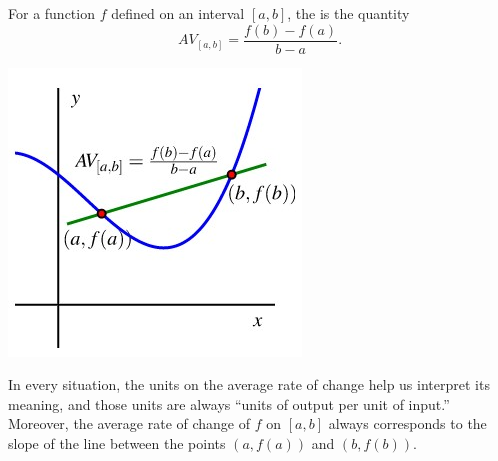 \documentclass[nooutcomes]{ximera}
\begin{document}
\begin{definition}
For a function \(f\) defined on an interval \([a,b]\), the  is the quantity%
\begin{equation*}
AV_{[a,b]} = \frac{f(b) - f(a)}{b-a}\text{.}
\end{equation*}

\begin{image}
\includegraphics{ARoCtext3.jpg}
\end{image}

\end{definition}
In every situation, the units on the average rate of change help us interpret its meaning, and those units are always ``units of output per unit of input.''   Moreover, the average rate of change of \(f\) on \([a,b]\) always corresponds to the slope of the line between the points \((a,f(a))\) and \((b,f(b))\).
\end{document}
